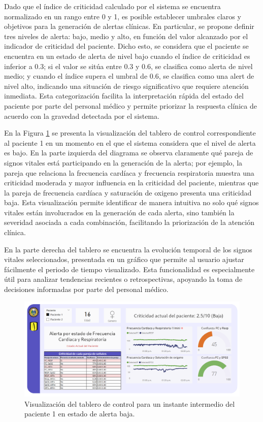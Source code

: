 Dado que el índice de criticidad calculado por el sistema se encuentra normalizado en un rango entre 0 y 1, es posible establecer umbrales claros y objetivos para la generación de alertas clínicas. En particular, se propone definir tres niveles de alerta: bajo, medio y alto, en función del valor alcanzado por el indicador de criticidad del paciente. Dicho esto, se considera que el paciente se encuentra en un estado de alerta de nivel bajo cuando el índice de criticidad es inferior a 0.3; si el valor se sitúa entre 0.3 y 0.6, se clasifica como alerta de nivel medio; y cuando el índice supera el umbral de 0.6, se clasifica como una alert de nivel alto, indicando una situación de riesgo significativo que requiere atención inmediata. Esta categorización facilita la interpretación rápida del estado del paciente por parte del personal médico y permite priorizar la respuesta clínica de acuerdo con la gravedad detectada por el sistema.

En la Figura \ref{fig:patient2_dashboard_baja_alerta} se presenta la visualización del tablero de control correspondiente al paciente 1 en un momento en el que el sistema considera que el nivel de alerta es bajo. En la parte izquierda del diagrama se observa claramente qué pareja de signos vitales está participando en la generación de la alerta; por ejemplo, la pareja que relaciona la frecuencia cardíaca y frecuencia respiratoria muestra una criticidad moderada y mayor influencia en la criticidad del paciente, mientras que la pareja de frecuencia cardíaca y saturación de oxigeno presenta una criticidad baja. Esta visualización permite identificar de manera intuitiva no solo qué signos vitales están involucrados en la generación de cada alerta, sino también la severidad asociada a cada combinación, facilitando la priorización de la atención clínica.

En la parte derecha del tablero se encuentra la evolución temporal de los signos vitales seleccionados, presentada en un gráfico que permite al usuario ajustar fácilmente el periodo de tiempo visualizado. Esta funcionalidad es especialmente útil para analizar tendencias recientes o retrospectivas, apoyando la toma de decisiones informadas por parte del personal médico.

\begin{figure}[H] \centering \includegraphics[width=\textwidth]{Images/TableroControl2.png} \caption{Visualización del tablero de control para un instante intermedio del paciente 1 en estado de alerta baja.} \label{fig:patient2_dashboard_baja_alerta}
\end{figure}

